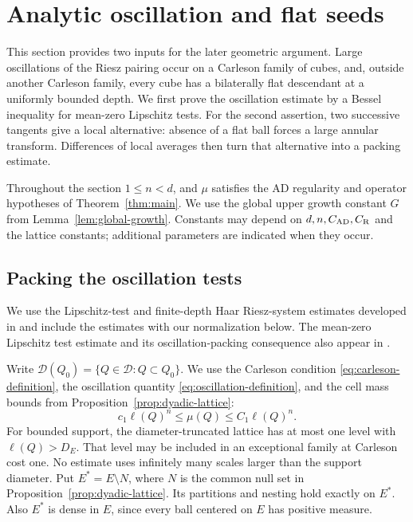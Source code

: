 \section{Analytic oscillation and flat seeds}
\label{sec:flat-balls}

This section provides two inputs for the later geometric argument.
Large oscillations of the Riesz pairing occur on a Carleson family of
cubes, and, outside another Carleson family, every cube has a
bilaterally flat descendant at a uniformly bounded depth.  We first prove the oscillation estimate by a Bessel inequality for
mean-zero Lipschitz tests. For the second assertion, two successive
tangents give a local alternative: absence of a flat ball forces a large
annular transform. Differences of local averages then turn that
alternative into a packing estimate.

Throughout the section $1\leq n<d$, and $\mu$ satisfies the
AD regularity and operator hypotheses of Theorem~\ref{thm:main}.
We use the global upper growth constant $G$ from
Lemma~\ref{lem:global-growth}.  Constants may depend on
$d,n,C_{\rm AD},C_{\rm R}$ and the lattice constants; additional
parameters are indicated when they occur.

\subsection{Packing the oscillation tests}

We use the Lipschitz-test and finite-depth Haar Riesz-system estimates
developed in \cite[Section~14]{NazarovTolsaVolberg2014} and include
the estimates with our normalization below. The mean-zero Lipschitz
test estimate and its oscillation-packing consequence also appear in
\cite[Section~5 and Appendix~B]{JayeNazarov2013}.

Write $\mathcal D(Q_0)=\{Q\in\mathcal D:Q\subset Q_0\}$.
We use the Carleson condition \eqref{eq:carleson-definition}, the
oscillation quantity \eqref{eq:oscillation-definition}, and the cell
mass bounds from Proposition~\ref{prop:dyadic-lattice}:
\begin{equation}\label{eq:packing-cell-masses}
 c_1\ell(Q)^n\le\mu(Q)\le C_1\ell(Q)^n.
\end{equation}
For bounded support, the diameter-truncated lattice has at most one
level with $\ell(Q)>D_E$. That level may be included in an exceptional
family at Carleson cost one. No estimate uses infinitely many scales
larger than the support diameter. Put $E^*=E\setminus N$, where $N$ is
the common null set in Proposition~\ref{prop:dyadic-lattice}. Its
partitions and nesting hold exactly on $E^*$. Also $E^*$ is dense in
$E$, since every ball centered on $E$ has positive measure.

